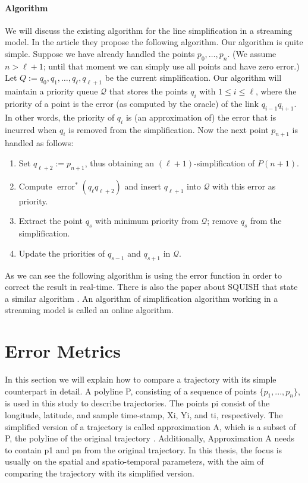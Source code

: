 \paragraph{Algorithm}
We will discuss the existing algorithm for the line simplification in a streaming model. In the article \cite{abam2007streaming} they propose the following algorithm. Our algorithm is quite simple. Suppose we have already handled the points $p_0, \ldots, p_n$. (We assume $n>\ell+1$; until that moment we can simply use all points and have zero error.) Let $Q:=q_0, q_1, \ldots, q_{\ell}, q_{\ell+1}$ be the current simplification. Our algorithm will maintain a priority queue $\mathcal{Q}$ that stores the points $q_i$ with $1 \leqslant i \leqslant \ell$, where the priority of a point is the error (as computed by the oracle) of the link $q_{i-1} q_{i+1}$. In other words, the priority of $q_i$ is (an approximation of) the error that is incurred when $q_i$ is removed from the simplification. Now the next point $p_{n+1}$ is handled as follows:

\begin{enumerate}
    \item  Set $q_{\ell+2}:=p_{n+1}$, thus obtaining an $(\ell+1)$-simplification of $P(n+1)$.
    \item  Compute $\operatorname{error}^*\left(q_{\ell} q_{\ell+2}\right)$ and insert $q_{\ell+1}$ into $\mathcal{Q}$ with this error as priority.
    \item  Extract the point $q_s$ with minimum priority from $\mathcal{Q}$; remove $q_s$ from the simplification.
    \item  Update the priorities of $q_{s-1}$ and $q_{s+1}$ in $\mathcal{Q}$.

\end{enumerate}

As we can see the following algorithm is using the error function in order to correct the result in real-time. There is also the paper about SQUISH that state a similar algorithm \cite{muckell2011squish}. An algorithm of simplification algorithm working in a streaming model is called an online algorithm. 




\section{Error Metrics}

In this section we will explain how to compare a trajectory with its simple counterpart in detail. A polyline P, consisting of a sequence of points $\{p_{1},..., p_{n}\}$, is used in this study  \cite{van2017extensive} to describe trajectories. The points pi consist of the longitude, latitude, and sample time-stamp, Xi, Yi, and ti, respectively. The simplified version of a trajectory is called approximation A, which is a subset of P, the polyline of the original trajectory \cite{van2017extensive}. Additionally, Approximation A needs to contain p1 and pn from the original trajectory. In this thesis, the focus is usually on the spatial and spatio-temporal parameters, with the aim of comparing the trajectory with its simplified version.

